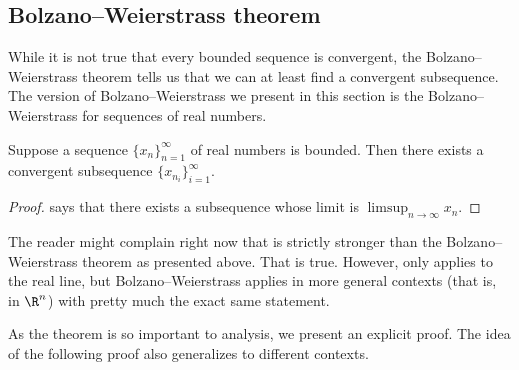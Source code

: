 \subsection{Bolzano--Weierstrass theorem}

While it is not true that every bounded sequence is convergent, the
Bolzano--Weierstrass theorem tells us that we can at least find a convergent
subsequence.
The version of Bolzano--Weierstrass 
we present in this section is the Bolzano--Weierstrass for
sequences of real numbers.

\begin{thm}\label{thm:bwseq}
Suppose a sequence $\{ x_n \}_{n=1}^\infty$ of real numbers is bounded.
Then there exists a convergent subsequence $\{ x_{n_i} \}_{i=1}^\infty$.
\end{thm}

\begin{proof}
 says that there exists
a subsequence whose limit is $\limsup_{n\to\infty} x_n$.
\end{proof}

The reader might complain right now that 
 is strictly stronger than the
Bolzano--Weierstrass theorem as presented above.  That is true.
However, 
 only applies to the real line, but
Bolzano--Weierstrass applies in more general contexts (that is, in $\R^n$)
with pretty much the exact same statement.

As the theorem is so important to analysis, we present an explicit
proof.
The idea of the following proof also generalizes to different contexts.

